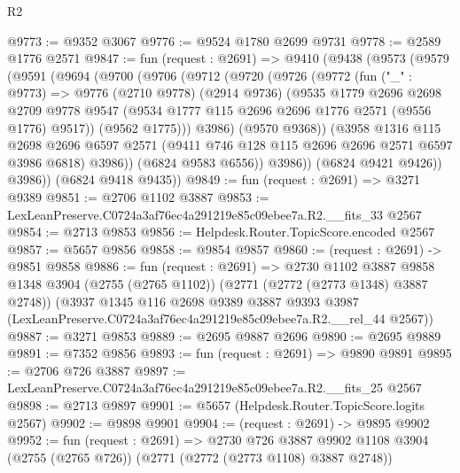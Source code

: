\begin{lexlean}{R2}
\begin{coremodule}
@9773 := @9352 @3067
@9776 := @9524 @1780 @2699 @9731
@9778 := @2589 @1776 @2571
@9847 := fun (request : @2691) =>
  @9410
    (@9438
      (@9573
        (@9579
          (@9591
            (@9694
              (@9700
                (@9706
                  (@9712
                    (@9720
                      (@9726
                        (@9772
                          (fun ("_" : @9773) =>
                          @9776
                            (@2710 @9778)
                            (@2914 @9736)
                            (@9535
                              @1779
                              @2696
                              @2698
                              @2709
                              @9778
                              @9547
                              (@9534 @1777 @115 @2696 @2696 @1776 @2571 (@9556 @1776) @9517))
                            (@9562 @1775)))
                        @3986)
                      (@9570 @9368))
                    (@3958
                      @1316
                      @115
                      @2698
                      @2696
                      @6597
                      @2571
                      (@9411 @746 @128 @115 @2696 @2696 @2571 @6597 @3986 @6818)
                      @3986))
                  (@6824 @9583 @6556))
                @3986))
            (@6824 @9421 @9426))
          @3986))
      (@6824 @9418 @9435))
@9849 := fun (request : @2691) => @3271 @9389
@9851 := @2706 @1102 @3887
@9853 := LexLeanPreserve.C0724a3af76ec4a291219e85c09ebee7a.R2.__fits_33 @2567
@9854 := @2713 @9853
@9856 := Helpdesk.Router.TopicScore.encoded @2567
@9857 := @5657 @9856
@9858 := @9854 @9857
@9860 := (request : @2691) -> @9851 @9858
@9886 := fun (request : @2691) =>
  @2730
    @1102
    @3887
    @9858
    @1348
    @3904
    (@2755 (@2765 @1102))
    (@2771 (@2772 (@2773 @1348) @3887 @2748))
    (@3937
      @1345
      @116
      @2698
      @9389
      @3887
      @9393
      @3987
      (LexLeanPreserve.C0724a3af76ec4a291219e85c09ebee7a.R2.__rel_44 @2567))
@9887 := @3271 @9853
@9889 := @2695 @9887 @2696
@9890 := @2695 @9889
@9891 := @7352 @9856
@9893 := fun (request : @2691) => @9890 @9891
@9895 := @2706 @726 @3887
@9897 := LexLeanPreserve.C0724a3af76ec4a291219e85c09ebee7a.R2.__fits_25 @2567
@9898 := @2713 @9897
@9901 := @5657 (Helpdesk.Router.TopicScore.logits @2567)
@9902 := @9898 @9901
@9904 := (request : @2691) -> @9895 @9902
@9952 := fun (request : @2691) =>
  @2730
    @726
    @3887
    @9902
    @1108
    @3904
    (@2755 (@2765 @726))
    (@2771 (@2772 (@2773 @1108) @3887 @2748))

\end{coremodule}
\end{lexlean}
